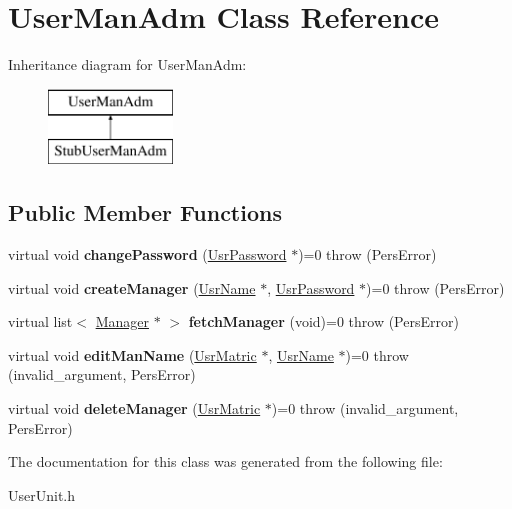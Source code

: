\hypertarget{classUserManAdm}{\section{User\-Man\-Adm Class Reference}
\label{da/d86/classUserManAdm}
}
Inheritance diagram for User\-Man\-Adm\-:\begin{figure}[H]
\begin{center}
\leavevmode
\includegraphics[height=2.000000cm]{da/d86/classUserManAdm}
\end{center}
\end{figure}
\subsection*{Public Member Functions}
\begin{DoxyCompactItemize}
\item 
\hypertarget{classUserManAdm_a75006ea396a6384bbf47918fe9316bce}{virtual void {\bfseries change\-Password} (\hyperlink{classUsrPassword}{Usr\-Password} $\ast$)=0  throw (\-Pers\-Error)}\label{da/d86/classUserManAdm_a75006ea396a6384bbf47918fe9316bce}

\item 
\hypertarget{classUserManAdm_a4c1d61e8190867eb786cdf97083ba289}{virtual void {\bfseries create\-Manager} (\hyperlink{classUsrName}{Usr\-Name} $\ast$, \hyperlink{classUsrPassword}{Usr\-Password} $\ast$)=0  throw (\-Pers\-Error)}\label{da/d86/classUserManAdm_a4c1d61e8190867eb786cdf97083ba289}

\item 
\hypertarget{classUserManAdm_a9efb85ba1a3cad428e6c0b2dfb044fd8}{virtual list$<$ \hyperlink{classManager}{Manager} $\ast$ $>$ {\bfseries fetch\-Manager} (void)=0  throw (\-Pers\-Error)}\label{da/d86/classUserManAdm_a9efb85ba1a3cad428e6c0b2dfb044fd8}

\item 
\hypertarget{classUserManAdm_a0440de1c9d712a8dac1aa4e526d0fe9b}{virtual void {\bfseries edit\-Man\-Name} (\hyperlink{classUsrMatric}{Usr\-Matric} $\ast$, \hyperlink{classUsrName}{Usr\-Name} $\ast$)=0  throw (invalid\-\_\-argument, Pers\-Error)}\label{da/d86/classUserManAdm_a0440de1c9d712a8dac1aa4e526d0fe9b}

\item 
\hypertarget{classUserManAdm_a3fd6ddb6b71743fe5ece3100206023c3}{virtual void {\bfseries delete\-Manager} (\hyperlink{classUsrMatric}{Usr\-Matric} $\ast$)=0  throw (invalid\-\_\-argument, Pers\-Error)}\label{da/d86/classUserManAdm_a3fd6ddb6b71743fe5ece3100206023c3}

\end{DoxyCompactItemize}


The documentation for this class was generated from the following file\-:\begin{DoxyCompactItemize}
\item 
User\-Unit.\-h\end{DoxyCompactItemize}
